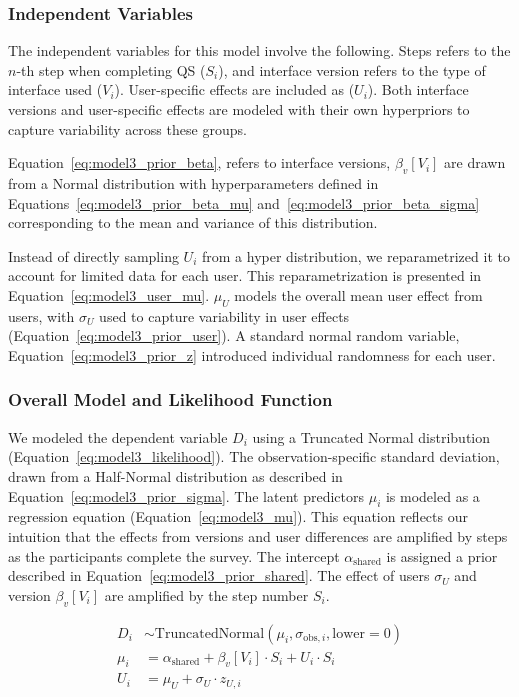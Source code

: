 \subsubsection{Independent Variables}
The independent variables for this model involve the following. Steps refers to the $n$-th step when completing QS ($S_i$), and interface version refers to the type of interface used ($V_i$). User-specific effects are included as ($U_i$). Both interface versions and user-specific effects are modeled with their own hyperpriors to capture variability across these groups. 

Equation~\ref{eq:model3_prior_beta}, refers to interface versions, $\beta_v[V_i]$ are drawn from a Normal distribution with hyperparameters defined in Equations~\ref{eq:model3_prior_beta_mu} and~\ref{eq:model3_prior_beta_sigma} corresponding to the mean and variance of this distribution. 

Instead of directly sampling $U_i$ from a hyper distribution, we reparametrized it to account for limited data for each user. This reparametrization is presented in Equation~\ref{eq:model3_user_mu}. $\mu_{U}$ models the overall mean user effect from users, with $\sigma_{U}$ used to capture variability in user effects (Equation~\ref{eq:model3_prior_user}). A standard normal random variable, Equation~\ref{eq:model3_prior_z} introduced individual randomness for each user.


\subsubsection{Overall Model and Likelihood Function}
We modeled the dependent variable $D_i$ using a Truncated Normal distribution (Equation~\ref{eq:model3_likelihood}). The observation-specific standard deviation, drawn from a Half-Normal distribution as described in Equation~\ref{eq:model3_prior_sigma}. The latent predictors $\mu_i$ is modeled as a regression equation (Equation~\ref{eq:model3_mu}). This equation reflects our intuition that the effects from versions and user differences are amplified by steps as the participants complete the survey. The intercept $\alpha_{\text{shared}}$ is assigned a prior described in Equation~\ref{eq:model3_prior_shared}. The effect of users $\sigma_{U}$ and version $\beta_v[V_i]$ are amplified by the step number $S_i$.

\begin{align}
    D_i &\sim \text{TruncatedNormal}(\mu_i, \sigma_{\text{obs},i}, \text{lower}=0) \label{eq:model3_likelihood} \\
    \mu_i &= \alpha_{\text{shared}} + \beta_v[V_i] \cdot S_i + U_i \cdot S_i \label{eq:model3_mu} \\
    U_i &= \mu_{U} + \sigma_{U} \cdot z_{U,i} \label{eq:model3_user_mu}
\end{align}

